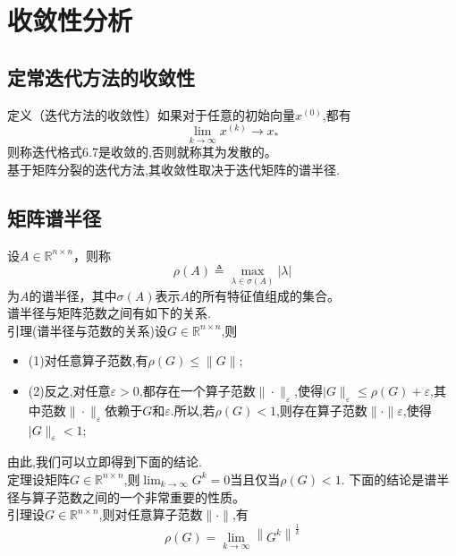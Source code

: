 \documentclass[12pt,a4paper]{article}
\begin{document}
\section{\color{blue}收敛性分析}
\subsection{定常迭代方法的收敛性}
{\color{blue}定义（迭代方法的收敛性）}如果对于任意的初始向量$x^{(0)}$,都有
$$\lim_{k\to \infty}x^{(k)}\to x_*$$
则称迭代格式{\color{blue}6.7}是{\color{blue}收敛}的,否则就称其为{\color{blue}发散}的。\\
基于矩阵分裂的迭代方法,其收敛性取决于迭代矩阵的谱半径.
\subsection*{矩阵谱半径}
设$A \in \mathbb{R}^{n \times n}$，则称
$$
\rho(A) \triangleq \max _{\lambda \in \sigma(A)}|\lambda|
$$
为$A$的{\color{blue}谱半径}，其中$\sigma(A)$表示$A$的所有特征值组成的集合。\\
谱半径与矩阵范数之间有如下的关系.\\
{\color{blue}引理(谱半径与范数的关系)}设$G \in \mathbb{R}^{n \times n}$,则
\begin{itemize}
\item (1)对任意算子范数,有$\rho(G) \leq\|G\|$;
\item (2)反之,对任意$\varepsilon>0$,都存在一个算子范数$\|\cdot\|_{\varepsilon}$,使得$| G \|_{\varepsilon} \leq\rho(G)+\varepsilon$,其中范数$\|\cdot\|_{\varepsilon}$依赖于$G$和$\varepsilon$.所以,若$\rho(G)<1$,则存在算子范数$\|\cdot\| \varepsilon$,使得$| G \|_{\varepsilon}<1$;
\end{itemize}
由此,我们可以立即得到下面的结论.\\
{\color{blue}定理}设矩阵$G \in \mathbb{R}^{n \times n}$,则$\lim _{k \rightarrow \infty} G^{k}=0$当且仅当$\rho(G)<1$.
下面的结论是谱半径与算子范数之间的一个非常重要的性质。\\
{\color{blue}引理}设$G \in \mathbb{R}^{n \times n}$,则对任意算子范数$\|\cdot\|$,有
$$
\rho(G)=\lim _{k \rightarrow \infty}\left\|G^{k}\right\|^{\frac{1}{k}}
$$
\end{document}
